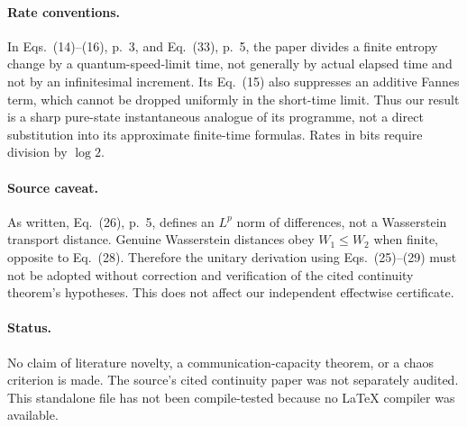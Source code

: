 \documentclass[11pt,a4paper]{article}
\begin{document}
\paragraph{Rate conventions.} In Eqs.~(14)--(16), p.~3, and Eq.~(33), p.~5, the paper divides a finite entropy change by a quantum-speed-limit time, not generally by actual elapsed time and not by an infinitesimal increment. Its Eq.~(15) also suppresses an additive Fannes term, which cannot be dropped uniformly in the short-time limit. Thus our result is a sharp pure-state instantaneous analogue of its programme, not a direct substitution into its approximate finite-time formulas. Rates in bits require division by $\log2$.
\paragraph{Source caveat.} As written, Eq.~(26), p.~5, defines an $L^p$ norm of differences, not a Wasserstein transport distance. Genuine Wasserstein distances obey $W_1\le W_2$ when finite, opposite to Eq.~(28). Therefore the unitary derivation using Eqs.~(25)--(29) must not be adopted without correction and verification of the cited continuity theorem's hypotheses. This does not affect our independent effectwise certificate.
\paragraph{Status.} No claim of literature novelty, a communication-capacity theorem, or a chaos criterion is made. The source's cited continuity paper was not separately audited. This standalone file has not been compile-tested because no LaTeX compiler was available.
\end{document}
